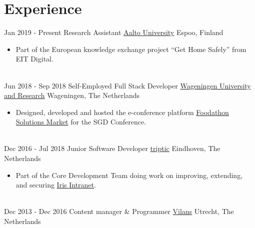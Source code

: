 \documentclass[letterpaper]{twentysecondcv} %
\begin{document}


\section{Experience}
\begin{twentyshort} %
    \twentyitem
    	{Jan 2019 -}
		{Present}
        {Research Assistant}
		{\href{https://aalto.fi}{Aalto University}}
        {Espoo, Finland}
        {
        \begin{itemize}
			\item Part of the European knowledge exchange project ``Get Home Safely'' from EIT Digital.
        \end{itemize}
        }
        \\
    \twentyitem
    	{Jun 2018 -}
		{Sep 2018}
        {Self-Employed Full Stack Developer}
		{\href{https://wur.nl}{Wageningen University and Research}}
        {Wageningen, The Netherlands}
        {
        \begin{itemize}
			\item Designed, developed and hosted the e-conference platform \href{https://foodathon-solutionsmarket.com/}{Foodathon Solutions Market} for the SGD Conference.
        \end{itemize}
        }
        \\
    \twentyitem
    	{Dec 2016 -}
		{Jul 2018}
        {Junior Software Developer}
		{\href{http://triptic.nl}{triptic}}
        {Eindhoven, The Netherlands}
        {
        \begin{itemize}
            \item Part of the Core Development Team doing work on improving, extending, and securing \href{https://www.irisintranet.com/}{Iris Intranet}.
        \end{itemize}
        }
        \\
	\twentyitem
    	{Dec 2013 -}
		{Dec 2016}
		{Content manager \& Programmer}
		{\href{http://www.vilans.nl/}{Vilans}}
        {Utrecht, The Netherlands}
        {}
\end{twentyshort}
\end{document}
